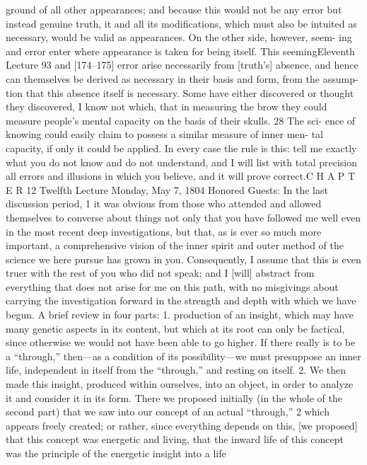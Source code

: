 ground of all other appearances; and because this would not be any error but
instead genuine truth, it and all its modifications, which must also be intuited
as necessary, would be valid as appearances. On the other side, however, seem-
ing and error enter where appearance is taken for being itself. This seemingEleventh Lecture
93
and [174–175] error arise necessarily from [truth’s] absence, and hence can
themselves be derived as necessary in their basis and form, from the assump-
tion that this absence itself is necessary. Some have either discovered or
thought they discovered, I know not which, that in measuring the brow they
could measure people’s mental capacity on the basis of their skulls. 28 The sci-
ence of knowing could easily claim to possess a similar measure of inner men-
tal capacity, if only it could be applied. In every case the rule is this: tell me
exactly what you do not know and do not understand, and I will list with total
precision all errors and illusions in which you believe, and it will prove correct.C H A P T E R
12
Twelfth Lecture
Monday, May 7, 1804
Honored Guests:
In the last discussion period, 1 it was obvious from those who attended and
allowed themselves to converse about things not only that you have followed
me well even in the most recent deep investigations, but that, as is ever so
much more important, a comprehensive vision of the inner spirit and outer
method of the science we here pursue has grown in you. Consequently, I
assume that this is even truer with the rest of you who did not speak; and I
[will] abstract from everything that does not arise for me on this path, with
no misgivings about carrying the investigation forward in the strength and
depth with which we have begun.
A brief review in four parts: 1. production of an insight, which may have
many genetic aspects in its content, but which at its root can only be factical,
since otherwise we would not have been able to go higher. If there really is to
be a “through,” then—as a condition of its possibility—we must presuppose
an inner life, independent in itself from the “through,” and resting on itself.
2. We then made this insight, produced within ourselves, into an object, in
order to analyze it and consider it in its form. There we proposed initially (in
the whole of the second part) that we saw into our concept of an actual
“through,” 2 which appears freely created; or rather, since everything depends
on this, [we proposed] that this concept was energetic and living, that the
inward life of this concept was the principle of the energetic insight into a life
